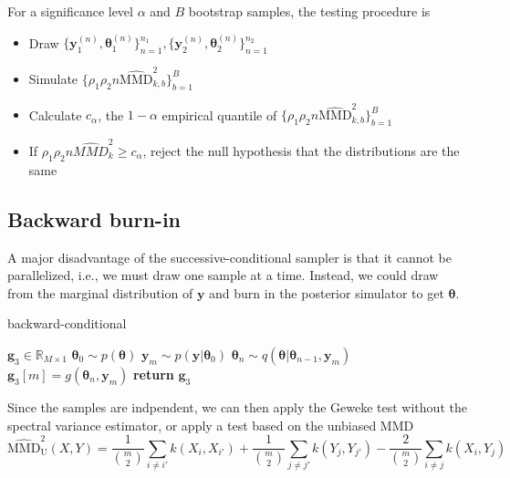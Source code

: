 \documentclass{article}
\begin{document}
For a significance level $\alpha$ and $B$ bootstrap samples, the testing procedure is
\begin{itemize}
    \item Draw $\{\mathbf{y}_{1}^{(n)}, \mathbf{\theta}_{1}^{(n)}\}_{n=1}^{n_{1}}, \{\mathbf{y}_{2}^{(n)}, \mathbf{\theta}_{2}^{(n)}\}_{n=1}^{n_{2}}$
    \item Simulate $\{\rho_{1} \rho_{2} n \widehat{\mathrm{MMD}}^{2}_{k, b}\}_{b=1}^{B}$
    \item Calculate $c_{\alpha}$, the $1-\alpha$ empirical quantile of $\{\rho_{1} \rho_{2} n \widehat{\mathrm{MMD}}^{2}_{k, b}\}_{b=1}^{B}$
    \item If $\rho_{1} \rho_{2} n \widehat{MMD}^{2}_{k} \geq c_{\alpha} $, reject the null hypothesis that the distributions are the same
\end{itemize}

\subsection{Backward burn-in}
A major disadvantage of the successive-conditional sampler is that it cannot be parallelized, i.e., we must draw one sample at a time. Instead, we could draw from the marginal distribution of $\mathbf{y}$ and burn in the posterior simulator to get $\mathbf{\theta}$. 

\begin{algorithm}[H]
    \centering
    \caption{backward-conditional}\label{alg:bc-sampler}
    \begin{algorithmic}[1]
        \State {} $\mathbf{g}_{3} \in \mathbb{R}_{M\times 1}$
            \State $\mathbf{\theta}_{0} \sim p(\mathbf{\theta})$ 
            \State $\mathbf{y}_{m} \sim p(\mathbf{y}|\mathbf{\theta}_{0})$ 
                \State $\mathbf{\theta}_{n} \sim q(\mathbf{\theta}|\mathbf{\theta}_{n-1}, \mathbf{y}_{m})$ 
            \EndFor
            \State $\mathbf{g}_{3}[m] = g(\mathbf{\theta}_{n}, \mathbf{y}_{m})$ 
        \EndFor        
        \State \textbf{return} $\mathbf{g}_{3}$
    \end{algorithmic}
\end{algorithm}

Since the samples are indpendent, we can then apply the Geweke test without the spectral variance estimator, or apply a test based on the unbiased MMD
\begin{equation}
\widehat{\mathrm{MMD}}_{\mathrm{U}}^{2}(X, Y) = \frac{1}{{m\choose 2}} \sum_{i \neq i'} k\left(X_{i}, X_{i'}\right)+\frac{1}{{m\choose 2}} \sum_{j \neq j'} k\left(Y_{j}, Y_{j'}\right)-\frac{2}{{m\choose 2}} \sum_{i \neq j} k\left(X_{i}, Y_{j}\right)
\end{equation}
\end{document}
